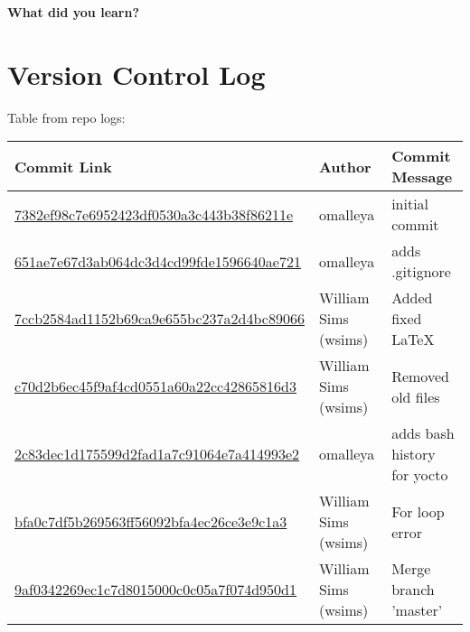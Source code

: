 \documentclass[10pt,letterpaper,draftclsnofoot,onecolumn]{IEEEtran}
\begin{document}
\noindent\textbf{What did you learn?}


\section{Version Control Log}
\noindent Table from repo logs:
\begin{center}
    \begin{tabular}{ | l | l | l |}
    \hline
    Commit Link & Author & Commit Message \\ \hline
    \href{https://github.com/omalleya/cs444-concurrency-writeups/commit/7382ef98c7e6952423df0530a3c443b38f86211e}{7382ef98c7e6952423df0530a3c443b38f86211e} & omalleya & initial commit \\ \hline
    \href{https://github.com/omalleya/cs444-concurrency-writeups/commit/651ae7e67d3ab064dc3d4cd99fde1596640ae721}{651ae7e67d3ab064dc3d4cd99fde1596640ae721} & omalleya & adds .gitignore \\ \hline
    \href{https://github.com/omalleya/cs444-concurrency-writeups/commit/7ccb2584ad1152b69ca9e655bc237a2d4bc89066}{7ccb2584ad1152b69ca9e655bc237a2d4bc89066} & William Sims (wsims) & Added fixed LaTeX \\ \hline
    \href{https://github.com/omalleya/cs444-concurrency-writeups/commit/c70d2b6ec45f9af4cd0551a60a22cc42865816d3}{c70d2b6ec45f9af4cd0551a60a22cc42865816d3} & William Sims (wsims) & Removed old files \\ \hline
    \href{https://github.com/omalleya/cs444-concurrency-writeups/commit/2c83dec1d175599d2fad1a7c91064e7a414993e2}{2c83dec1d175599d2fad1a7c91064e7a414993e2} & omalleya & adds bash history for yocto \\ \hline
    \href{https://github.com/omalleya/cs444-concurrency-writeups/commit/bfa0c7df5b269563ff56092bfa4ec26ce3e9c1a3}{bfa0c7df5b269563ff56092bfa4ec26ce3e9c1a3} & William Sims (wsims) & For loop error \\ \hline
    \href{https://github.com/omalleya/cs444-concurrency-writeups/commit/9af0342269ec1c7d8015000c0c05a7f074d950d1}{9af0342269ec1c7d8015000c0c05a7f074d950d1} & William Sims (wsims) & Merge branch 'master' \\ \hline

\end{tabular}
\end{center}
\end{document}
